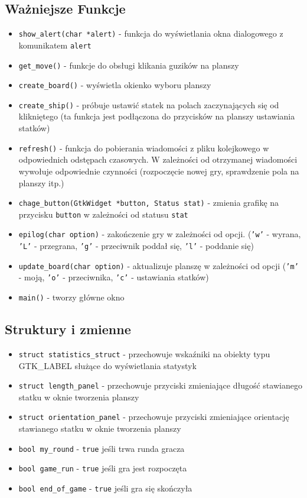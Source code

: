 \documentclass[a4paper]{article}
\begin{document}
\subsection{Ważniejsze Funkcje}
\begin{itemize}
    \item \texttt{show\_alert(char *alert)} - funkcja do wyświetlania okna dialogowego z komunikatem \texttt{alert}
    \item \texttt{get\_move()} - funkcje do obsługi klikania guzików na planszy
    \item \texttt{create\_board()} - wyświetla okienko wyboru planszy
    \item \texttt{create\_ship()} - próbuje ustawić statek na polach zaczynających się od klikniętego
(ta funkcja jest podłączona do przycisków na planszy ustawiania statków)
    \item \texttt{refresh()} - funkcja do pobierania wiadomości z pliku kolejkowego w odpowiednich odstępach czasowych.
W zależności od otrzymanej wiadomości wywołuje odpowiednie czynności (rozpoczęcie nowej gry, sprawdzenie pola na planszy itp.)
    \item \texttt{chage\_button(GtkWidget *button, Status stat)} - zmienia grafikę na przycisku \texttt{button}
w zależności od statusu \texttt{stat}
    \item \texttt{epilog(char option)} - zakończenie gry w zależności od opcji. (\texttt{'w'} - wyrana, \texttt{'L'} - przegrana,
\texttt{'g'} - przeciwnik poddał się, \texttt{'l'} - poddanie się)
    \item \texttt{update\_board(char option)} - aktualizuje planszę w zależności od opcji (\texttt{'m'} - moją,
\texttt{'o'} - przeciwnika, \texttt{'c'} - ustawiania statków)
    \item \texttt{main()} - tworzy główne okno
\end{itemize}

\subsection{Struktury i zmienne}
\begin{itemize}
    \item \texttt{struct statistics\_struct} - przechowuje wskaźniki na obiekty typu GTK\_LABEL służące
do wyświetlania statystyk
    \item \texttt{struct length\_panel} - przechowuje przyciski zmieniające długość stawianego statku
w oknie tworzenia planszy
    \item \texttt{struct orientation\_panel} - przechowuje przyciski zmieniające orientację stawianego
statku w oknie tworzenia planszy
    \item \texttt{bool my\_round} - \texttt{true} jeśli trwa runda gracza
    \item \texttt{bool game\_run} - \texttt{true} jeśli gra jest rozpoczęta
    \item \texttt{bool end\_of\_game} - \texttt{true} jeśli gra się skończyła
\end{itemize}   
\end{document}
